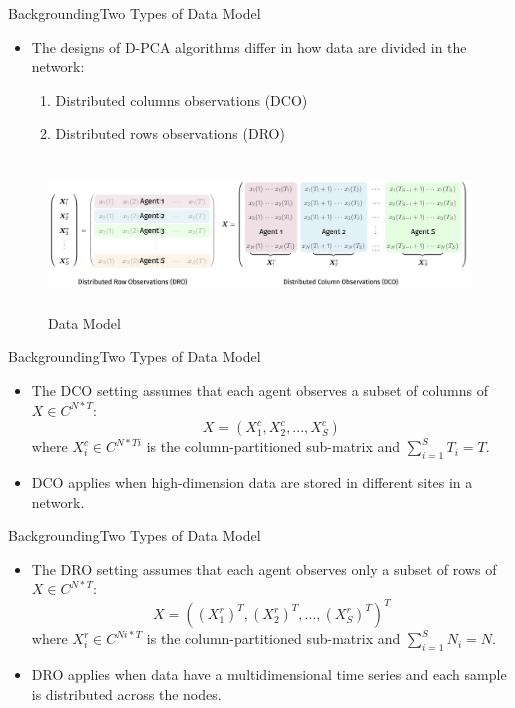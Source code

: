\documentclass{beamer}
\begin{document}
\begin{frame}{Backgrounding}{Two Types of Data Model}
	 \begin{itemize}
		\item{
			The designs of D-PCA algorithms differ in how data are divided in the network:
			\begin{enumerate}
			  \item Distributed columns observations (DCO)
			  \item Distributed rows observations (DRO)
			\end{enumerate}
		}
	 \end{itemize}
	\begin{figure}[ht]
		\includegraphics[width=12cm, height=4cm]{2.png}
		\caption{Data Model} 
		\label{Data Model}	
	\end{figure}	 
\end{frame}

\begin{frame}{Backgrounding}{Two Types of Data Model}
	 \begin{itemize}
	 	\item{
	 		The DCO setting assumes that each agent observes a subset of columns of $ X \in {C^{N*T}} $:
	 		\[X = (X_1^c,X_2^c,...,X_S^c)\]
	 		where $ X_i^c \in {C^{N*Ti}} $ is the column-partitioned sub-matrix and $ \sum\limits_{i = 1}^S {{T_i}}  = T $.
	 	}
		\item{
			DCO applies when high-dimension data are stored in different sites in a network.
		}
	 \end{itemize} 
\end{frame}

\begin{frame}{Backgrounding}{Two Types of Data Model}
	 \begin{itemize}
	 	\item{
	 	The DRO setting assumes that each agent observes only a subset of rows of $ X \in {C^{N*T}} $:
	 	\[X = {({(X_1^r)^T},{(X_2^r)^T},...,{(X_S^r)^T})^T}\]
	 	where $ X_i^r \in {C^{Ni*T}} $ is the column-partitioned sub-matrix and $ \sum\limits_{i = 1}^S {{N_i}}  = N $. 
	 	}
		\item{
			DRO applies when data have a multidimensional time series and each sample is distributed across the nodes.
		}
	 \end{itemize} 
\end{frame}
\end{document}
